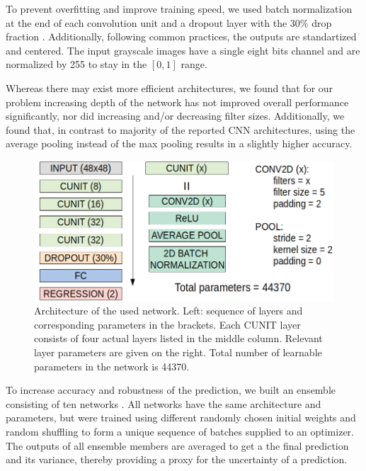 \documentclass{svjour3}                     %
\begin{document}
To prevent overfitting and improve training speed, we used batch normalization at the end of each convolution unit \cite{ioffe2015batch} and a dropout layer with the 30\% drop fraction \cite{srivastava2014dropout}. Additionally, following common practices, the outputs are standartized and centered. The input grayscale images have a single eight bits channel and are normalized by 255 to stay in the $[0, 1]$ range.

Whereas there may exist more efficient architectures, we found that for our problem increasing depth of the network has not improved overall performance significantly, nor did increasing and/or decreasing filter sizes. Additionally, we found that, in contrast to majority of the reported CNN architectures, using the average pooling instead of the max pooling results in a slightly higher accuracy.

\begin{figure}
\includegraphics[width=\textwidth]{figs/figure_CNN.png}
\caption{Architecture of the used network. Left: sequence of layers and corresponding parameters in the brackets. Each CUNIT layer consists of four actual layers listed in the middle column. Relevant layer parameters are given on the right. Total number of learnable parameters in the network is 44370.}
\label{fig:figcnn}
\end{figure}

To increase accuracy and robustness of the prediction, we built an ensemble consisting of ten networks \cite{hinton2015distilling}. All networks have the same architecture and parameters, but were trained using different randomly chosen initial weights \cite{glorot2010understanding, he2015delving} and random shuffling to form a unique sequence of batches supplied to an optimizer. The outputs of all ensemble members are averaged to get a the final prediction and its variance, thereby providing a proxy for the uncertainty of a prediction.
\end{document}
